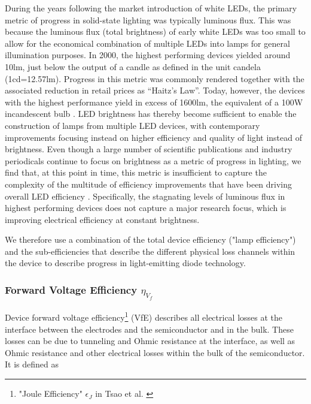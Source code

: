 \documentclass[twoside,twocolumn,9pt]{article}
\begin{document}
During the years following the market introduction of white LEDs, the primary metric of progress in solid-state lighting was typically luminous flux. This was because the luminous flux (total brightness) of early white LEDs was too small to allow for the economical combination of multiple LEDs into lamps for general illumination purposes. In 2000, the highest performing devices yielded around 10lm, just below the output of a candle as defined in the unit candela (1cd=12.57lm)\cite{haitz2011solid}. Progress in this metric was commonly rendered together with the associated reduction in retail prices as “Haitz’s Law”\cite{haitz1999case}\cite{haitz2011solid}. Today, however, the devices with the highest performance yield in excess of 1600lm, the equivalent of a 100W incandescent bulb \cite{cree2020bright}. LED brightness has thereby become sufficient to enable the construction of lamps from multiple LED devices, with contemporary improvements focusing instead on higher efficiency and quality of light instead of brightness. Even though a large number of scientific publications and industry periodicals continue to focus on brightness as a metric of progress in lighting, we find that, at this point in time, this metric is insufficient to capture the complexity of the multitude of efficiency improvements that have been driving overall LED efficiency \cite{weinold2021compound}. Specifically,  the stagnating levels of luminous flux in highest performing devices does not capture a major research focus, which is improving electrical efficiency at constant brightness.

We therefore use a combination of the total device efficiency ("lamp efficiency") and the sub-efficiencies that describe the different physical loss channels within the device to describe progress in light-emitting diode technology.

\subsubsection{Forward Voltage Efficiency $\eta_{V_f}$}

Device forward voltage efficiency\footnote{"Joule Efficiency" $\epsilon_J$ in Tsao et al. \cite{tsao2010solid}} (VfE) describes all electrical losses at the interface between the electrodes and the semiconductor and in the bulk. These losses can be due to tunneling and Ohmic resistance at the interface, as well as Ohmic resistance and other electrical losses within the bulk of the semiconductor. It is defined as
\end{document}
